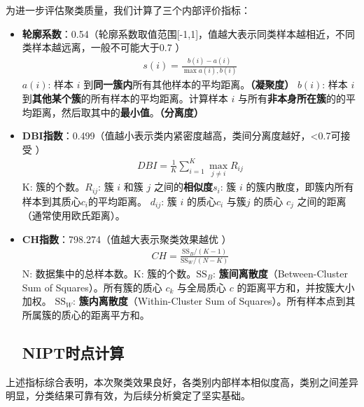 \documentclass{article}
\begin{document}
为进一步评估聚类质量，我们计算了三个内部评价指标：
\begin{itemize}
    \item \textbf{轮廓系数}：0.54（轮廓系数取值范围[-1,1]，值越大表示同类样本越相近，不同类样本越远离，一般不可能大于0.7 ）
          \begin{gather}
              s(i)=\frac{b(i)-a(i)}{\max{a(i),b(i)}} \tag{4}
          \end{gather}
          \( a(i) \): 样本 \( i \) 到\textbf{同一簇内}所有其他样本的平均距离。\textbf{（凝聚度）}
          \textbf{\( b(i) \)}: 样本 \( i \) 到\textbf{其他某个簇}的所有样本的平均距离。计算样本 \( i \)
          与所有\textbf{非本身所在簇}的的平均距离，然后取其中的\textbf{最小值}。\textbf{（分离度）}

    \item \textbf{DBI指数}：0.499（值越小表示类内紧密度越高，类间分离度越好，<0.7可接受 ）
          \begin{gather}
              DBI = \frac{1}{K} \sum_{i=1}^{K} \max_{j \neq i} R_{ij} \tag{5}
          \end{gather}
          K: 簇的个数。$R_{ij}$: 簇 $i$ 和簇 $j$ 之间的\textbf{相似度}$s_i$: 簇 $i$ 的簇内散度，即簇内所有样本到其质心$c_i$的平均距离。
          $d_{ij}$: 簇 $i$ 的质心$ c_i$ 与簇$j$ 的质心 $c_j$ 之间的距离（通常使用欧氏距离）。

    \item \textbf{CH指数}：798.274（值越大表示聚类效果越优 ）
          \begin{gather}
              CH = \frac{\text{SS}_B / (K - 1)}{\text{SS}_W / (N - K)}
          \end{gather}
          N: 数据集中的总样本数。K: 簇的个数。$\text{SS}_B$: \textbf{簇间离散度}（Between-Cluster Sum
          of Squares）。所有簇的质心 $c_k$ 与全局质心 $c$ 的距离平方和，并按簇大小加权。
          $\text{SS}_W$: \textbf{簇内离散度}（Within-Cluster Sum of Squares）。所有样本点到其所属簇的质心的距离平方和。

          \subsection{\textbf{NIPT时点计算}}

\end{itemize}
上述指标综合表明，本次聚类效果良好，各类别内部样本相似度高，类别之间差异明显，分类结果可靠有效，为后续分析奠定了坚实基础。
\end{document}
